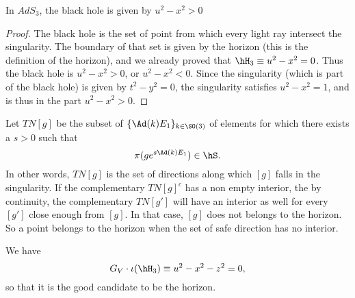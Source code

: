 	\begin{lemma}		\label{LemTNTroisIneq}
		In $AdS_3$, the black hole is given by $u^2-x^2>0$
	\end{lemma}

	\begin{proof}
		The black hole is the set of point from which every light ray intersect the singularity. The boundary of that set is given by the horizon (this is the definition of the horizon), and we already proved that $\hH_3\equiv u^2-x^2=0$. Thus the black hole is $u^2-x^2>0$, or $u^2-x^2<0$. Since the singularity (which is part of the black hole) is given by $t^2-y^2=0$, the singularity satisfies $u^2-x^2=1$, and is thus in the part $u^2-x^2>0$.
	\end{proof}


	Let $TN[g]$ be the subset of $\{ \Ad(k)E_1 \}_{k\in \SO(3)}$ of elements for which there exists a $s>0$ such that
	\begin{equation}
		\pi(g e^{s\Ad(k)E_1})\in\hS.
	\end{equation}
	In other words, $TN[g]$ is the set of directions along which $[g]$ falls in the singularity. If the complementary $TN[g]^c$ has a non empty interior, the by continuity, the complementary $TN[g']$ will have an interior as well for every $[g']$ close enough from $[g]$. In that case, $[g]$ does not belongs to the horizon. So a point belongs to the horizon when the set of safe direction has no interior.


	\begin{lemma}
		We have
		\begin{equation}
			G_V\cdot\iota(\hH_3)\equiv u^2-x^2-z^2=0,
		\end{equation}
		so that it is the good candidate to be the horizon.
	\end{lemma}

